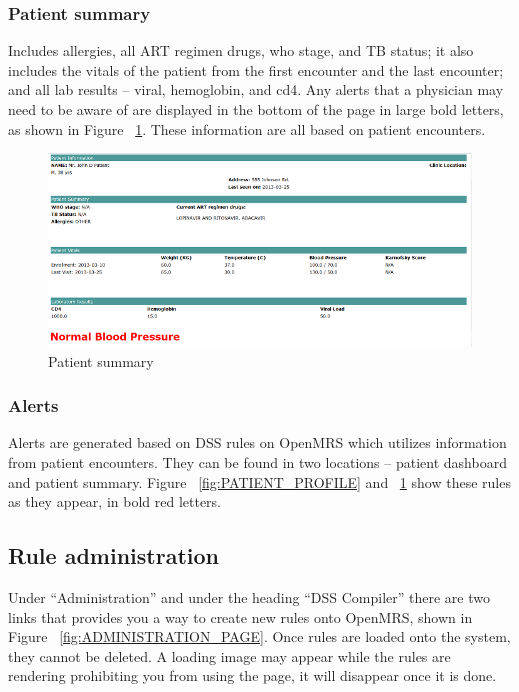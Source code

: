 \documentclass[12pt,letterpaper]{article}
\begin{document}
\subsubsection{Patient summary}
	Includes allergies, all ART regimen drugs, who stage, and TB status; it also includes the vitals of the patient from the first encounter and the last encounter; and all lab results – viral, hemoglobin, and cd4. Any alerts that a physician may need to be aware of are displayed in the bottom of the page in large bold letters, as shown in Figure ~\ref{fig:PATIENT_SUMMARY}. These information are all based on patient encounters.

\begin{figure}[htbp]
\begin{center}
\includegraphics[width=6.5in]{user_guide/patient_summary.png}
\end{center}
\caption{Patient summary}
\label{fig:PATIENT_SUMMARY}
\end{figure}


\subsubsection{Alerts}
	Alerts are generated based on DSS rules on OpenMRS which utilizes information from patient encounters. They can be found in two locations – patient dashboard and patient summary. Figure ~\ref{fig:PATIENT_PROFILE} and ~\ref{fig:PATIENT_SUMMARY} show these rules as they appear, in bold red letters.

\subsection{Rule administration}
	Under “Administration” and under the heading “DSS Compiler” there are two links that provides you a way to create new rules onto OpenMRS, shown in Figure ~\ref{fig:ADMINISTRATION_PAGE}. Once rules are loaded onto the system, they cannot be deleted. A loading image may appear while the rules are rendering prohibiting you from using the page, it will disappear once it is done.
\end{document}
